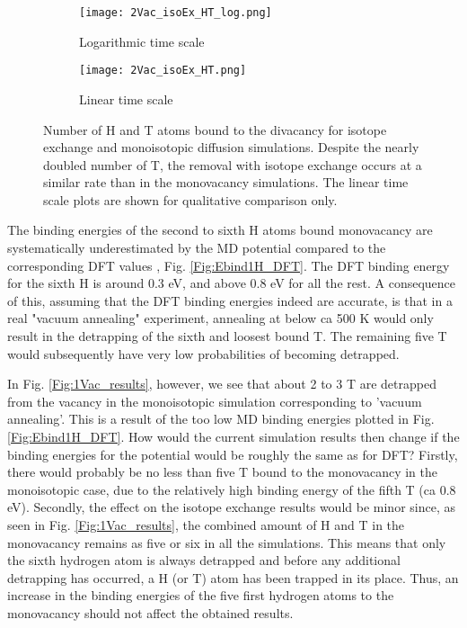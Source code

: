 \begin{figure}[!ht]
\begin{subfigure}{.5\textwidth}
  \centering
 \texttt{[image: 2Vac\_isoEx\_HT\_log.png]}  
  \caption{Logarithmic time scale}
\end{subfigure}
\begin{subfigure}{.5\textwidth}
  \centering
  \texttt{[image: 2Vac\_isoEx\_HT.png]}  
  \caption{Linear time scale}
\end{subfigure}
   \caption{Number of H and T atoms bound to the divacancy for isotope exchange and monoisotopic diffusion simulations. Despite the nearly doubled number of T, the removal with isotope exchange occurs at a similar rate than in the monovacancy simulations. The linear time scale plots are shown for qualitative comparison only.}
   \label{Fig:2Vac_results} 
\end{figure}

The binding energies of the second to sixth H atoms bound monovacancy are systematically underestimated by the MD potential compared to the corresponding DFT values \cite{heinolaTungstenDFT}, Fig. \ref{Fig:Ebind1H_DFT}.
The DFT binding energy for the sixth H is around 0.3 eV, and above 0.8 eV for all the rest.
A consequence of this, assuming that the DFT binding energies indeed are accurate, is that in a real "vacuum annealing" experiment, annealing at below ca 500 K would only result in the detrapping of the sixth and loosest bound T.
The remaining five T would subsequently have very low probabilities of becoming detrapped.

In Fig. \ref{Fig:1Vac_results}, however, we see that about 2 to 3 T are detrapped from the vacancy in the monoisotopic simulation corresponding to 'vacuum annealing'.
This is a result of the too low MD binding energies plotted in Fig. \ref{Fig:Ebind1H_DFT}.
How would the current simulation results then change if the binding energies for the potential would be roughly the same as for DFT?
Firstly, there would probably be no less than five T bound to the monovacancy in the monoisotopic case, due to the relatively high binding energy of the fifth T (ca 0.8 eV).
Secondly, the effect on the isotope exchange results would be minor since, as seen in Fig. \ref{Fig:1Vac_results}, the combined amount of H and T in the monovacancy remains as five or six in all the simulations.
This means that only the sixth hydrogen atom is always detrapped and before any additional detrapping has occurred, a H (or T) atom has been trapped in its place.
Thus, an increase in the binding energies of the five first hydrogen atoms to the monovacancy should not affect the obtained results.

